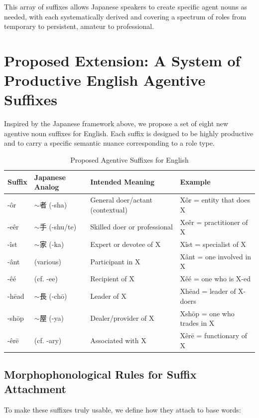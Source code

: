 \documentclass[11pt]{article}
\begin{document}
This array of suffixes allows Japanese speakers to create specific agent nouns as needed, with each systematically derived and covering a spectrum of roles from temporary to persistent, amateur to professional.

\section{Proposed Extension: A System of Productive English Agentive Suffixes}

Inspired by the Japanese framework above, we propose a set of eight new agentive noun suffixes for English. Each suffix is designed to be highly productive and to carry a specific semantic nuance corresponding to a role type.

\begin{table}[h]
\centering
\begin{tabular}{|l|l|l|l|}
\hline
\textbf{Suffix} & \textbf{Japanese Analog} & \textbf{Intended Meaning} & \textbf{Example} \\
\hline
-ôr & $\sim$者 (-sha) & General doer/actant (contextual) & Xôr = entity that does X \\
-eêr & $\sim$手 (-shu/te) & Skilled doer or professional & Xeêr = practitioner of X \\
-îst & $\sim$家 (-ka) & Expert or devotee of X & Xîst = specialist of X \\
-ânt & (various) & Participant in X & Xânt = one involved in X \\
-êé & (cf. -ee) & Recipient of X & Xêé = one who is X-ed \\
-hēad & $\sim$長 (-chō) & Leader of X & Xhēad = leader of X-doers \\
-shōp & $\sim$屋 (-ya) & Dealer/provider of X & Xshōp = one who trades in X \\
-êrē & (cf. -ary) & Associated with X & Xêrē = functionary of X \\
\hline
\end{tabular}
\caption{Proposed Agentive Suffixes for English}
\end{table}

\subsection{Morphophonological Rules for Suffix Attachment}

To make these suffixes truly usable, we define how they attach to base words:
\end{document}
